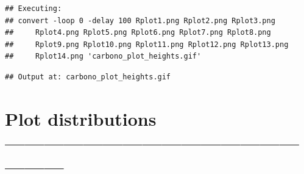 \documentclass[]{article}
\newenvironment{Shaded}{\begin{snugshade}}{\end{snugshade}}
\newcommand{\CommentTok}[1]{\textcolor[rgb]{0.56,0.35,0.01}{\textit{#1}}}
\newcommand{\DataTypeTok}[1]{\textcolor[rgb]{0.13,0.29,0.53}{#1}}
\newcommand{\KeywordTok}[1]{\textcolor[rgb]{0.13,0.29,0.53}{\textbf{#1}}}
\newcommand{\NormalTok}[1]{#1}
\newcommand{\OperatorTok}[1]{\textcolor[rgb]{0.81,0.36,0.00}{\textbf{#1}}}
\newcommand{\StringTok}[1]{\textcolor[rgb]{0.31,0.60,0.02}{#1}}
\begin{document}
\begin{Shaded}
\end{Shaded}

\begin{verbatim}
## Executing: 
## convert -loop 0 -delay 100 Rplot1.png Rplot2.png Rplot3.png
##     Rplot4.png Rplot5.png Rplot6.png Rplot7.png Rplot8.png
##     Rplot9.png Rplot10.png Rplot11.png Rplot12.png Rplot13.png
##     Rplot14.png 'carbono_plot_heights.gif'
\end{verbatim}

\begin{verbatim}
## Output at: carbono_plot_heights.gif
\end{verbatim}

\hypertarget{plot-distributions}{%
\section{Plot distributions
------------------------------------------------------}\label{plot-distributions}}

\begin{Shaded}
\end{Shaded}
\end{document}
